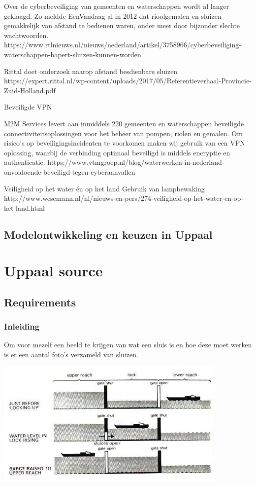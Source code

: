 {{{{{{{{{{{{{{Over de cyberbeveiliging van gemeenten en waterschappen wordt al langer geklaagd. Zo meldde EenVandaag al in 2012 dat rioolgemalen en sluizen gemakkelijk van afstand te bedienen waren, onder meer door bijzonder slechte wachtwoorden.
https://www.rtlnieuws.nl/nieuws/nederland/artikel/3758966/cyberbeveiliging-waterschappen-hapert-sluizen-kunnen-worden

Rittal doet onderzoek naarop afstand besdienbare sluizen
https://expert.rittal.nl/wp-content/uploads/2017/05/Referentieverhaal-Provincie-Zuid-Holland.pdf



Beveiligde VPN

M2M Services levert aan inmiddels 220 gemeenten en waterschappen beveiligde connectiviteitsoplossingen voor het beheer van pompen, riolen en gemalen. Om risico’s op beveiligingsincidenten te voorkomen maken wij gebruik van een VPN oplossing, waarbij de verbinding optimaal beveiligd is middels encryptie en authenticatie.
https://www.vtmgroep.nl/blog/waterwerken-in-nederland-onvoldoende-beveiligd-tegen-cyberaanvallen

Veiligheid op het water én op het land
Gebruik van lampbewaking 
http://www.wesemann.nl/nl/nieuws-en-pers/274-veiligheid-op-het-water-en-op-het-land.html



\newpage
\section{Modelontwikkeling en keuzen in Uppaal}
\chapter{Uppaal source}
\label{appendix}
\thispagestyle{myheadings}

	\section{Requirements}
\subsection{Inleiding}
Om voor mezelf een beeld te krijgen van wat een sluis is en hoe deze moet werken is er een aantal foto's verzameld van sluizen.	
	
	\includegraphics[scale=0.65]{sluismodel.jpg}
	
}}}}}}}}}}}}}}
